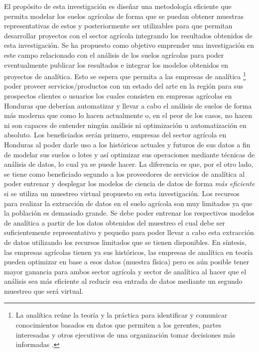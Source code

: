 \documentclass{report}
\begin{document}
El propósito de esta investigación es diseñar una metodología eficiente que permita modelar los suelos agrícolas de forma que se puedan obtener muestras representativas de estos y posteriormente ser utilizables para que permitan desarrollar proyectos con el sector agrícola integrando los resultados obtenidos de esta investigación. Se ha propuesto como objetivo emprender una investigación en este campo relacionado con el análisis de los suelos agrícolas para poder eventualmente publicar los resultados e integrar los modelos obtenidos en proyectos de analítica. Esto se espera que permita a las empresas de analítica \footnote{La analítica reúne la teoría y la práctica para identificar y comunicar conocimientos basados en datos que permiten a los gerentes, partes interesadas y otros ejecutivos de una organización tomar decisiones más informadas \cite{eastwood-data-analyst-2021}.} poder proveer servicios/productos con un estado del arte en la región para sus prospectos clientes o usuarios los cuales consisten en empresas agrícolas en Honduras que deberían automatizar y llevar a cabo el análisis de suelos de forma más moderna que como lo hacen actualmente o, en el peor de los casos, no hacen ni son capaces de entender ningún análisis ni optimización u automatización en absoluto. Los beneficiados serán primero, empresas del sector agrícola en Honduras al poder darle uso a los históricos actuales y futuros de sus datos a fin de modelar sus suelos o lotes y así optimizar sus operaciones mediante técnicas de análisis de datos, lo cual ya se puede hacer. La diferencia es que, por el otro lado, se tiene como beneficiado segundo a los proveedores de servicios de analítica al poder entrenar y desplegar los modelos de ciencia de datos de forma \textit{más eficiente} si se utiliza un muestreo virtual propuesto en esta investigación. Los recursos para realizar la extracción de datos en el suelo agrícola son muy limitados ya que la población es demasiado grande. Se debe poder entrenar los respectivos modelos de analítica a partir de los datos obtenidos del muestreo el cual debe ser suficientemente representativo y pequeño para poder llevar a cabo esta extracción de datos utilizando los recursos limitados que se tienen disponibles. En síntesis, las empresas agrícolas tienen ya sus históricos, las empresas de analítica en teoría pueden optimizar en base a esos datos (muestra física) pero es aún posible tener mayor ganancia para ambos sector agrícola y sector de analítica al hacer que el análisis sea más eficiente al reducir esa entrada de datos mediante un segundo muestreo que será virtual.
\end{document}
